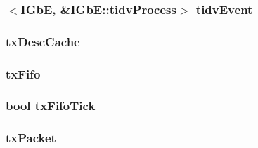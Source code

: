 \label{classIGbE_a13b02e56360d63f349a514edb321bd9c}
\hypertarget{classIGbE_a91fce863693eb4c56a924639620d77cf}{
\subsubsection[{tidvEvent}]{$<${\bf IGbE}, \&IGbE::tidvProcess$>$ {\bf tidvEvent}}}
\label{classIGbE_a91fce863693eb4c56a924639620d77cf}
\hypertarget{classIGbE_a8ab7bc15342abe2e4fe9d9bde951441b}{
\subsubsection[{txDescCache}]{ {\bf txDescCache}}}
\label{classIGbE_a8ab7bc15342abe2e4fe9d9bde951441b}
\hypertarget{classIGbE_ae699c324753236e0a59aa2465920eb46}{
\subsubsection[{txFifo}]{ {\bf txFifo}}}
\label{classIGbE_ae699c324753236e0a59aa2465920eb46}
\hypertarget{classIGbE_a99be71cc5dbbb45b77d1d66d1bedf454}{
\subsubsection[{txFifoTick}]{\setlength{\rightskip}{0pt plus 5cm}bool {\bf txFifoTick}}}
\label{classIGbE_a99be71cc5dbbb45b77d1d66d1bedf454}
\hypertarget{classIGbE_a8d22e1a154942ff0d4ab9048e7e844bb}{
\subsubsection[{txPacket}]{ {\bf txPacket}}}
